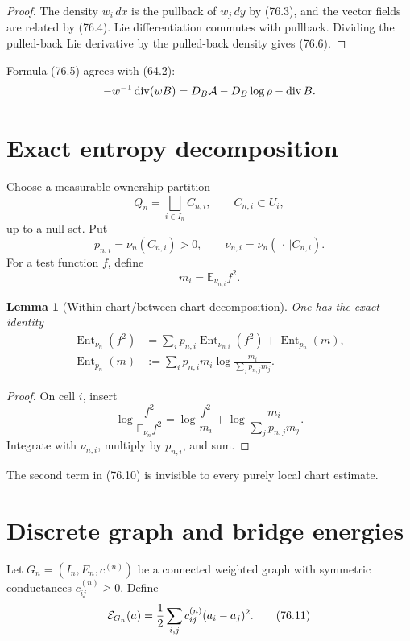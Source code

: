 \documentclass[11pt]{article}
\newtheorem{lemma}[theorem]{Lemma}
\theoremstyle{remark}
\begin{document}
\begin{proof}
The density \(w_i\,dx\) is the pullback of \(w_j\,dy\) by (76.3),
and the vector fields are related by (76.4).  Lie differentiation
commutes with pullback.  Dividing the pulled-back Lie derivative by
the pulled-back density gives (76.6).
\end{proof}

Formula (76.5) agrees with (64.2):
\[
 -w^{-1}\operatorname{div}(wB)
 =
 D_B{\cal A}-D_B\log\rho-\operatorname{div}B.
\]

\section{Exact entropy decomposition}

Choose a measurable ownership partition
\[
 Q_n=\bigsqcup_{i\in I_n}C_{n,i},\qquad C_{n,i}\subset U_i,      \tag{76.7}
\]
up to a null set.  Put
\[
 p_{n,i}=\nu_n(C_{n,i})>0,\qquad
 \nu_{n,i}=\nu_n(\,\cdot\,|C_{n,i}).                  \tag{76.8}
\]
For a test function \(f\), define
\[
 m_i=\mathbb E_{\nu_{n,i}}f^2.                        \tag{76.9}
\]

\begin{lemma}[Within-chart/between-chart decomposition]
\label{lem:v15v76-entropy-split}
One has the exact identity
\[
\begin{split}
 \operatorname{Ent}_{\nu_n}(f^2)
 &=
 \sum_i p_{n,i}
 \operatorname{Ent}_{\nu_{n,i}}(f^2)
 +\operatorname{Ent}_{p_n}(m),                        \tag{76.10}\\
 \operatorname{Ent}_{p_n}(m)
 &:=
 \sum_i p_{n,i}m_i
 \log\frac{m_i}{\sum_jp_{n,j}m_j}.
\end{split}
\]
\end{lemma}

\begin{proof}
On cell \(i\), insert
\[
 \log\frac{f^2}{\mathbb E_{\nu_n}f^2}
 =
 \log\frac{f^2}{m_i}
 +\log\frac{m_i}{\sum_jp_{n,j}m_j}.
\]
Integrate with \(\nu_{n,i}\), multiply by \(p_{n,i}\), and sum.
\end{proof}

The second term in (76.10) is invisible to every purely local
chart estimate.

\section{Discrete graph and bridge energies}

Let \(G_n=(I_n,E_n,c^{(n)})\) be a connected weighted graph with
symmetric conductances \(c_{ij}^{(n)}\geq0\).  Define
\[
 {\cal E}_{G_n}(a)
 =
 \frac12\sum_{i,j}c_{ij}^{(n)}(a_i-a_j)^2.             \tag{76.11}
\]
\end{document}
